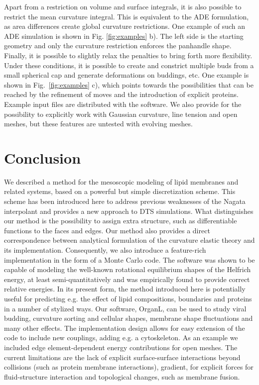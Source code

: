 \documentclass[twocolumn]{biophys-new}
\begin{document}
Apart from a restriction on volume and surface integrals, it is also possible to restrict the mean curvature integral. This is equivalent to the ADE formulation, as area differences create global curvature restrictions. One example of such an ADE simulation is shown in Fig. \ref{fig:examples} b). The left side is the starting geometry and only the curvature restriction enforces the panhandle shape. Finally, it is possible to slightly relax the penalties to bring forth more flexibility. Under these conditions, it is possible to create and constrict multiple buds from a small spherical cap and generate deformations on buddings, etc. One example is shown in Fig.~\ref{fig:examples} c), which points towards the possibilities that can be reached by the refinement of moves and the introduction of explicit proteins. Example input files are distributed with the software. We also provide for the possibility to explicitly work with Gaussian curvature, line tension and open meshes, but these features are untested with evolving meshes. 

\section*{Conclusion}

We described a method for the mesoscopic modeling of lipid membranes and related systems, based on a powerful but simple discretization scheme. This scheme has been introduced here to address previous weaknesses of the Nagata interpolant and provides a new approach to DTS simulations. What distinguishes our method is the possibility to assign extra structure, such as differentiable functions to the faces and edges. Our method also provides a direct correspondence between analytical formulation of the curvature elastic theory and its implementation.
Consequently, we also introduce a feature-rich implementation in the form of a Monte Carlo code. The software was shown to be capable of modeling the well-known rotational equilibrium shapes of the Helfrich energy, at least semi-quantitatively and was empirically found to provide correct relative energies.
In its present form, the method introduced here is potentially useful for predicting e.g. the effect of lipid compositions, boundaries and proteins in a number of stylized ways. Our software, OrganL, can be used to study viral budding, curvature sorting and cellular shapes, membrane shape fluctuations and many other effects. The implementation design allows for easy extension of the code to include new couplings, adding e.g. a cytoskeleton. As an example we included edge element-dependent energy contributions for open meshes. The current limitations are the lack of explicit surface-surface interactions beyond collisions (such as protein membrane interactions), gradient, for explicit forces for fluid-structure interaction and topological changes, such as membrane fusion. 
\end{document}
